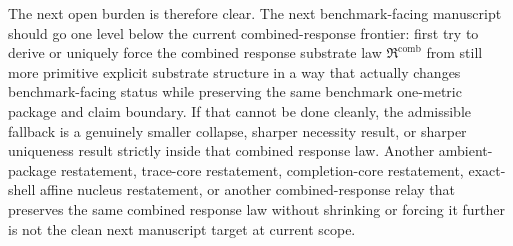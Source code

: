 \documentclass[11pt]{article}
\newcommand{\CombinedLaw}{\mathfrak R^{\mathrm{comb}}}
\begin{document}
The next open burden is therefore clear. The next benchmark-facing manuscript should go one level below the current combined-response frontier: first try to derive or uniquely force the combined response substrate law \(\CombinedLaw\) from still more primitive explicit substrate structure in a way that actually changes benchmark-facing status while preserving the same benchmark one-metric package and claim boundary. If that cannot be done cleanly, the admissible fallback is a genuinely smaller collapse, sharper necessity result, or sharper uniqueness result strictly inside that combined response law. Another ambient-package restatement, trace-core restatement, completion-core restatement, exact-shell affine nucleus restatement, or another combined-response relay that preserves the same combined response law without shrinking or forcing it further is not the clean next manuscript target at current scope.
\end{document}

